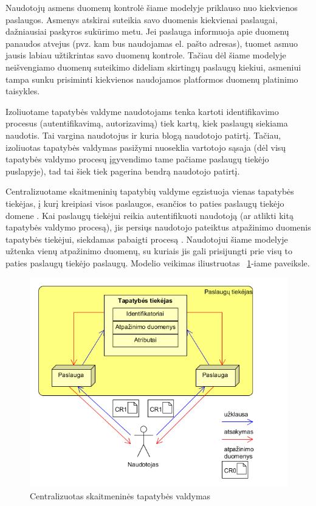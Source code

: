 Naudotojų asmens duomenų kontrolė šiame modelyje priklauso nuo kiekvienos paslaugos. Asmenys atskirai suteikia savo duomenis
kiekvienai paslaugai, dažniausiai paskyros sukūrimo metu. Jei paslauga informuoja apie duomenų panaudos atvejus (pvz. kam bus naudojamas
el. pašto adresas), tuomet asmuo jausis labiau užtikrintas savo duomenų kontrole. Tačiau dėl šiame modelyje neišvengiamo duomenų suteikimo
dideliam skirtingų paslaugų kiekiui, asmeniui tampa sunku prisiminti kiekvienos naudojamos platformos duomenų platinimo taisykles.

Izoliuotame tapatybės valdyme naudotojams tenka kartoti identifikavimo procesus (autentifikavimą, autorizavimą) tiek kartų, kiek paslaugų siekiama
naudotis. Tai vargina naudotojus ir kuria blogą naudotojo patirtį. Tačiau, izoliuotas tapatybės valdymas pasižymi nuoseklia vartotojo sąsaja (dėl 
visų tapatybės valdymo procesų įgyvendimo tame pačiame paslaugų tiekėjo puslapyje), tad tai šiek tiek pagerina bendrą naudotojo patirtį.


Centralizuotame skaitmeninių tapatybių valdyme egzistuoja vienas tapatybės tiekėjas, į kurį kreipiasi visos paslaugos,
esančios to paties paslaugų tiekėjo domene \cite{Josang2005}. Kai paslaugų tiekėjui
reikia autentifikuoti naudotoją (ar atlikti kitą tapatybės valdymo procesą), jis persiųs naudotojo pateiktus atpažinimo duomenis tapatybės tiekėjui,
siekdamas pabaigti procesą \cite{Cao2010}. Naudotojui šiame modelyje užtenka vienų atpažinimo duomenų, su kuriais jis gali prisijungti prie visų to paties
paslaugų tiekėjo paslaugų. Modelio veikimas iliustruotas \hypertarget{fig:centralisedModel}{~\ref{fig:centralisedModel}}-iame paveiksle.

\begin{figure}[H]
    \centering
    \includegraphics[scale=0.8]{img/centralizedModel}
    \caption{Centralizuotas skaitmeninės tapatybės valdymas \cite{Cao2010}}
    \label{fig:centralisedModel}
\end{figure}

